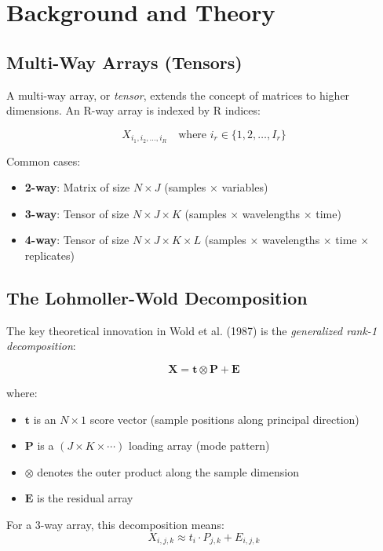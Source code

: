 \documentclass[12pt,a4paper]{article}
\begin{document}
\newpage

\section{Background and Theory}

\subsection{Multi-Way Arrays (Tensors)}

A multi-way array, or \textit{tensor}, extends the concept of matrices to higher dimensions. An R-way array is indexed by R indices:

$$X_{i_1, i_2, \ldots, i_R} \quad \text{where } i_r \in \{1, 2, \ldots, I_r\}$$

Common cases:
\begin{itemize}
    \item \textbf{2-way}: Matrix of size $N \times J$ (samples × variables)
    \item \textbf{3-way}: Tensor of size $N \times J \times K$ (samples × wavelengths × time)
    \item \textbf{4-way}: Tensor of size $N \times J \times K \times L$ (samples × wavelengths × time × replicates)
\end{itemize}

\subsection{The Lohmoller-Wold Decomposition}

The key theoretical innovation in Wold et al. (1987) is the \textit{generalized rank-1 decomposition}:

$$\mathbf{X} = \mathbf{t} \otimes \mathbf{P} + \mathbf{E}$$

where:
\begin{itemize}
    \item $\mathbf{t}$ is an $N \times 1$ score vector (sample positions along principal direction)
    \item $\mathbf{P}$ is a $(J \times K \times \cdots)$ loading array (mode pattern)
    \item $\otimes$ denotes the outer product along the sample dimension
    \item $\mathbf{E}$ is the residual array
\end{itemize}

For a 3-way array, this decomposition means:
$$X_{i,j,k} \approx t_i \cdot P_{j,k} + E_{i,j,k}$$
\end{document}

